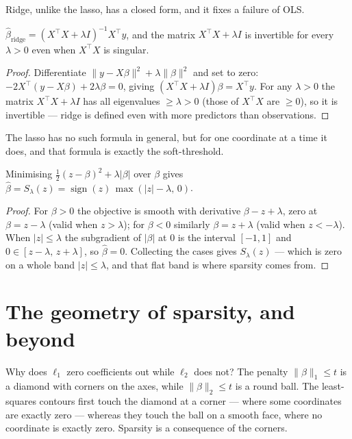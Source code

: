 \documentclass[11pt]{article}
\begin{document}
Ridge, unlike the lasso, has a closed form, and it fixes a failure of OLS.

\begin{theorem}
$\hat\beta_{\text{ridge}} = (X^\top X + \lambda I)^{-1} X^\top y$, and the
matrix $X^\top X + \lambda I$ is invertible for every $\lambda > 0$ even when
$X^\top X$ is singular.
\end{theorem}
\begin{proof}
Differentiate $\|y-X\beta\|^2 + \lambda\|\beta\|^2$ and set to zero:
$-2X^\top(y - X\beta) + 2\lambda\beta = 0$, giving
$(X^\top X + \lambda I)\beta = X^\top y$. For any $\lambda>0$ the matrix
$X^\top X + \lambda I$ has all eigenvalues $\ge \lambda > 0$ (those of
$X^\top X$ are $\ge 0$), so it is invertible --- ridge is defined even with
more predictors than observations.
\end{proof}

The lasso has no such formula in general, but for one coordinate at a time it
does, and that formula is exactly the soft-threshold.

\begin{theorem}
Minimising $\tfrac12(z - \beta)^2 + \lambda|\beta|$ over $\beta$ gives
$\hat\beta = S_\lambda(z) = \operatorname{sign}(z)\,\max(|z|-\lambda,\,0)$.
\end{theorem}
\begin{proof}
For $\beta>0$ the objective is smooth with derivative $\beta - z + \lambda$,
zero at $\beta = z-\lambda$ (valid when $z>\lambda$); for $\beta<0$ similarly
$\beta = z+\lambda$ (valid when $z<-\lambda$). When $|z|\le\lambda$ the
subgradient of $|\beta|$ at $0$ is the interval $[-1,1]$ and $0 \in
[z-\lambda,\,z+\lambda]$, so $\hat\beta=0$. Collecting the cases gives
$S_\lambda(z)$ --- which is zero on a whole band $|z|\le\lambda$, and that
flat band is where sparsity comes from.
\end{proof}

\section{The geometry of sparsity, and beyond}

Why does $\ell_1$ zero coefficients out while $\ell_2$ does not? The penalty
$\|\beta\|_1 \le t$ is a diamond with corners on the axes, while
$\|\beta\|_2 \le t$ is a round ball. The least-squares contours first touch
the diamond at a corner --- where some coordinates are exactly zero ---
whereas they touch the ball on a smooth face, where no coordinate is exactly
zero. Sparsity is a consequence of the corners.
\end{document}
